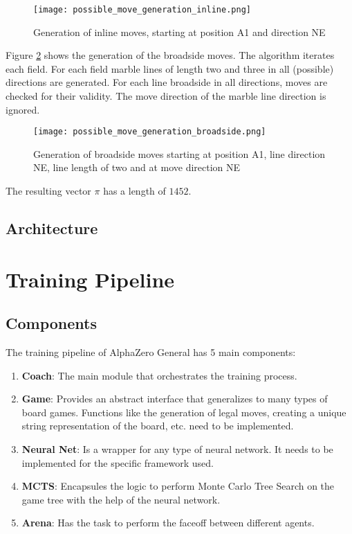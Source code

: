 \begin{enumerate}
          \begin{figure}
              \centering
              \texttt{[image: possible\_move\_generation\_inline.png]}
              \caption{Generation of inline moves, starting at position A1 and direction NE}
              \label{possible_move_generation_inline}
          \end{figure}

          Figure \ref{possible_move_generation_broadside} shows the generation of the broadside moves. The algorithm iterates each field. For each field marble lines of length two and three in all (possible) directions are generated. For each line broadside in all directions, moves are checked for their validity. The move direction of the marble line direction is ignored.

          \begin{figure}
              \centering
              \texttt{[image: possible\_move\_generation\_broadside.png]}
              \caption{Generation of broadside moves starting at position A1, line direction NE, line length of two and at move direction NE}
              \label{possible_move_generation_broadside}
          \end{figure}

          The resulting vector $\pi$ has a length of $1452$.
\end{enumerate}

\subsection{Architecture}
\section{Training Pipeline}
\subsection{Components}
\label{components}

The training pipeline of AlphaZero General has 5 main components:
\begin{enumerate}
    \item \textbf{Coach}: The main module that orchestrates the training process.
    \item \textbf{Game}: Provides an abstract interface that generalizes to many types of board games. Functions like the generation of legal moves, creating a unique string representation of the board, etc. need to be implemented.
    \item \textbf{Neural Net}: Is a wrapper for any type of neural network. It needs to be implemented for the specific framework used.
    \item \textbf{MCTS}: Encapsules the logic to perform Monte Carlo Tree Search on the game tree with the help of the neural network.
    \item \textbf{Arena}: Has the task to perform the faceoff between different agents.
\end{enumerate}

